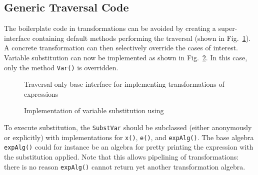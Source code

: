 \subsection{Generic Traversal Code}

The boilerplate code in transformations can be avoided by creating a
super-interface containing default methods performing the traversal
(shown in Fig.~\ref{generic_transform}). A concrete transformation can
then selectively override the cases of interest. Variable substitution
can now be implemented as shown in Fig.~\ref{substvars_with_id}. In
this case, only the method \lstinline{Var()} is overridden.


\begin{figure}[t]
\nocaptionrule
\caption{Traversal-only base interface for implementing transformations of expressions}
\label{generic_transform}
\end{figure}


\begin{figure}[t]
\nocaptionrule
\caption{Implementation of variable substitution using \name}
\label{substvars_with_id}
\end{figure}


To execute substitution, the \lstinline{SubstVar} should be subclassed
(either anonymously or explicitly) with implementations for
\lstinline{x()}, \lstinline{e()}, and \lstinline{expAlg()}. The base
algebra \lstinline{expAlg()} could for instance be an algebra for
pretty printing the expression with the substitution applied. Note
that this allows pipelining of transformations: there is no reason
\lstinline{expAlg()} cannot return yet another transformation
algebra.

\begin{comment}
\haoyuan{Begin: client code.}

Here we also give the client code. With the same expression \lstinline{x + (y + 2)}, a \lstinline{SubstVar} object is created. The base algebra \lstinline{expAlg()} here is implemented with an instance of \lstinline{FreeVars}, and we also override \lstinline{x()} and \lstinline{e()} aiming to substitute another variable \lstinline{"z"} for \lstinline{"x"}. The code is as follows, where the result of execution becomes \lstinline{[y, z]}.


\haoyuan{End: client code.}
\end{comment}


